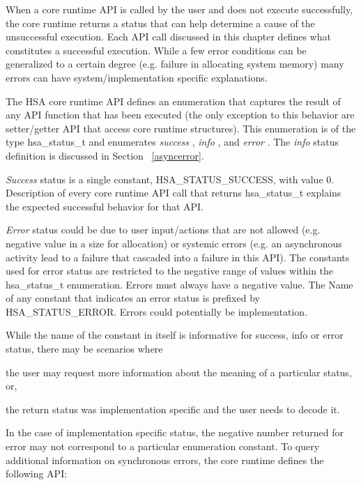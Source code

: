 \documentclass{book}
\newcommand{\emphld}[1]{\begin{DIFnomarkup} \emph{#1} \end{DIFnomarkup}}
\newcommand{\reftyp}[1]{#1}
\newcommand{\refenu}[1]{\reftyp{#1}}
\newenvironment{DIFnomarkup}{}{}
\begin{document}
When a core runtime API is called by the user and does not execute
successfully, the core runtime returns a status that can help
determine a cause of the unsuccessful execution. Each API call
discussed in this chapter defines what constitutes a successful
execution. While a few error conditions can be generalized to a
certain degree (e.g. failure in allocating system memory) many
errors can have system/implementation specific explanations.

The HSA core runtime API defines an enumeration that captures the
result of any API function that has been executed (the only
exception to this behavior are setter/getter API that access core
runtime structures). This enumeration is of the type
\reftyp{hsa\_status\_t} and enumerates \emphld{success},
\emphld{info}, and \emphld{error}. The \emphld{info} status definition
is discussed in Section ~\ref{asyncerror}.

\vspace{3mm}\emphld{Success} status is a single constant,
\refenu{HSA\_STATUS\_SUCCESS}, with value 0. Description of every core
runtime API call that returns \reftyp{hsa\_status\_t} explains the
expected successful behavior for that API.

\emphld{Error} status could be due to user input/actions that are not
allowed (e.g. negative value in a size for allocation) or systemic
errors (e.g. an asynchronous activity lead to a failure that
cascaded into a failure in this API). The constants used for error
status are restricted to the negative range of values within the
\reftyp{hsa\_status\_t} enumeration. Errors must always have a
negative value. The Name of any constant that indicates an error status is
prefixed by \refenu{HSA\_STATUS\_ERROR}. Errors could potentially be
implementation.

While the name of the constant in itself is informative for success,
info or error status, there may be scenarios where
\begin{inparaenum}[(i)] \item the user may request more information
about the meaning of a particular status, or, \item the return
status was implementation specific and the user needs to decode it.
\end{inparaenum} In the case of implementation specific status, the
negative number returned for error may not correspond to a
particular enumeration constant. To query additional
information on synchronous errors, the core runtime defines the
following API:
\end{document}
